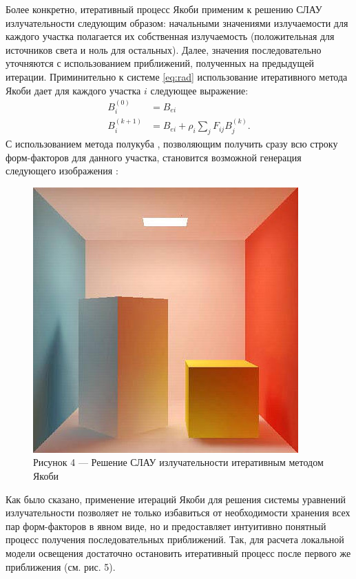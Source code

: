 \documentclass[12pt]{article}
\begin{document}
Более конкретно, итеративный процесс Якоби применим к решению СЛАУ излучательности следующим образом: начальными значениями излучаемости для каждого участка полагается их собственная излучаемость (положительная для источников света и ноль для остальных). Далее, значения последовательно уточняются с использованием приближений, полученных на предыдущей итерации. Приминительно к системе \eqref{eq:rad} использование итеративного метода Якоби дает для каждого участка $i$ следующее выражение:
\begin{equation}
\begin{split}
B_i^{(0)} &= B_{ei}\\
B_i^{(k + 1)} &= B_{ei} + \rho_i \sum_j F_{ij} B_j^{(k)}.\label{eq:iter}
\end{split}
\end{equation}
С использованием метода полукуба \cite{Coh85}, позволяющим получить сразу всю строку форм-факторов для данного участка, становится возможной генерация следующего изображения \cite{Coh85}:
\begin{figure}[h]
\centering
\includegraphics[scale=0.647]{cohen.jpg}
\caption*{Рисунок 4 --- Решение СЛАУ излучательности итеративным методом Якоби}
\end{figure}

Как было сказано, применение итераций Якоби для решения системы уравнений излучательности позволяет не только избавиться от необходимости хранения всех пар форм-факторов в явном виде, но и предоставляет интуитивно понятный процесс получения последовательных приближений. Так, для расчета локальной модели освещения достаточно остановить итеративный процесс после первого же приближения (см. рис. 5).
\end{document}
